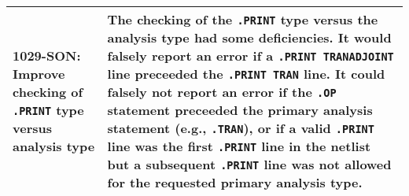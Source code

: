 {\begin{longtable}[h] {>{\raggedright\small}m{2in}|>{\raggedright\let\\\tabularnewline\small}m{3.5in}}
  \textbf{1029-SON}: Improve checking of \texttt{.PRINT} type versus
analysis type & The checking of the \texttt{.PRINT} type versus the
analysis type had some deficiencies. It would falsely report an error
if a \texttt{.PRINT TRANADJOINT} line preceeded the \texttt{.PRINT
TRAN} line.  It could falsely not report an error if the \texttt{.OP}
statement preceeded the primary analysis statement (e.g.,
\texttt{.TRAN}), or if a valid \texttt{.PRINT} line was the first \texttt{.PRINT}
line in the netlist but a subsequent \texttt{.PRINT} line was not allowed
for the requested primary analysis type. \\ \hline

\end{longtable}
}
